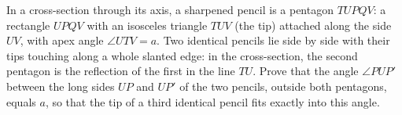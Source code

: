 In a cross-section through its axis, a sharpened pencil is a pentagon $TUPQV$: a rectangle $UPQV$ with an isosceles triangle $TUV$ (the tip) attached along the side $UV$, with apex angle $\angle UTV=a$. Two identical pencils lie side by side with their tips touching along a whole slanted edge: in the cross-section, the second pentagon is the reflection of the first in the line $TU$. Prove that the angle $\angle PUP'$ between the long sides $UP$ and $UP'$ of the two pencils, outside both pentagons, equals $a$, so that the tip of a third identical pencil fits exactly into this angle.
